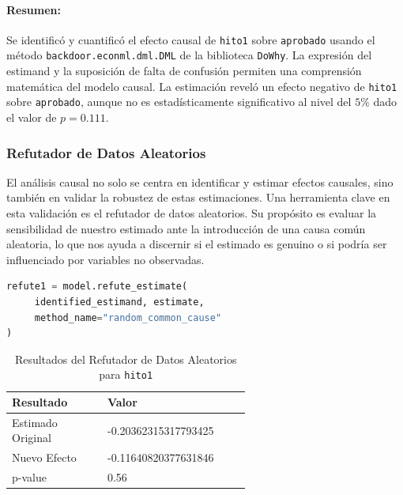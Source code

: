 \paragraph{Resumen:}
Se identificó y cuantificó el efecto causal de \texttt{hito1} sobre \texttt{aprobado} usando el método \texttt{backdoor.econml.dml.DML} de la biblioteca \texttt{DoWhy}. La expresión del estimand y la suposición de falta de confusión permiten una comprensión matemática del modelo causal. La estimación reveló un efecto negativo de \texttt{hito1} sobre \texttt{aprobado}, aunque no es estadísticamente significativo al nivel del \(5\%\) dado el valor de \( p = 0.111 \). 


\subsubsection{Refutador de Datos Aleatorios}

El análisis causal no solo se centra en identificar y estimar efectos causales, sino también en validar la robustez de estas estimaciones. Una herramienta clave en esta validación es el refutador de datos aleatorios. Su propósito es evaluar la sensibilidad de nuestro estimado ante la introducción de una causa común aleatoria, lo que nos ayuda a discernir si el estimado es genuino o si podría ser influenciado por variables no observadas.

\begin{minipage}{0.5\textwidth}
    \begin{lstlisting}[language=Python, caption=Refutador de datos aleatorios para \texttt{hito1}, label=lst:RefutadorDatosAleatoriosHito1]
refute1 = model.refute_estimate(
     identified_estimand, estimate, 
     method_name="random_common_cause"
)
\end{lstlisting}
\end{minipage}
\hfill
\begin{minipage}{0.45\textwidth}
    \begin{table}[H]
        \centering        
        \begin{tabular}{lp{0.6\linewidth}}
            \toprule
            \textbf{Resultado} & \textbf{Valor} \\
            \midrule
            Estimado Original & -0.20362315317793425 \\
            Nuevo Efecto & -0.11640820377631846 \\
            p-value & 0.56 \\
            \bottomrule
        \end{tabular}
        \caption{Resultados del Refutador de Datos Aleatorios para \texttt{hito1}}
        \label{tab:refutador_datos_aleatorios_hito1}
    \end{table}
\end{minipage}

